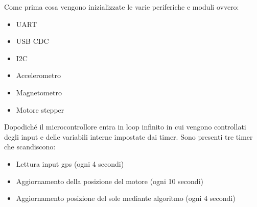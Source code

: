\noindent Come prima cosa vengono inizializzate le varie periferiche e moduli
ovvero:

\begin{itemize}
\item
  
  UART
  
\item
  
  USB CDC
  
\item
  
  I2C
  
\item
  
  Accelerometro
  
\item
  
  Magnetometro
  
\item
  
  Motore stepper
  
\end{itemize}

\noindent Dopodiché il microcontrollore entra in loop infinito in cui vengono
controllati degli input e delle variabili interne impostate dai timer.
Sono presenti tre timer che scandiscono:

\begin{itemize}
\item
  
  Lettura input gps (ogni 4 secondi)
  
\item
  
  Aggiornamento della posizione del motore (ogni 10 secondi)
  
\item
  
  Aggiornamento posizione del sole mediante algoritmo (ogni 4 secondi)
  
\end{itemize}

